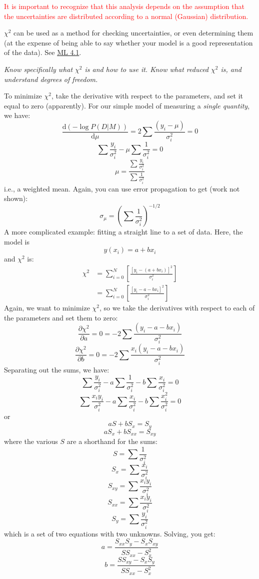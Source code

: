 \documentclass[12pt]{article}
\begin{document}
\textcolor{red}{It is important to recognize that this analysis depends
on the assumption that the uncertainties are distributed according to
a normal (Gaussian) distribution.}

$\chi^2$ can be used as a method for checking uncertainties, or even
determining them (at the expense of being able to say whether your
model is a good representation of the data).
See \href{http://astronomy.nmsu.edu/holtz/a575/images/ML4.1.png}
{ML 4.1}.

\colorbox{hl}{\parbox{0.9\textwidth}
{\emph{Know specifically what $\chi^2$ is and how to use it.
Know what reduced $\chi^2$ is, and understand degrees
of freedom.
}}}

To minimize $\chi^2$, take the derivative with respect to the parameters,
and set it equal to zero (apparently).
For our simple model of measuring a \emph{single quantity}, we have:
$$ \frac{\mathrm{d}(-\log P(D|M))}{\mathrm{d}\mu} =
2\sum\frac{(y_{i}-\mu)}{\sigma_i^2} = 0 $$
$$ \sum\frac{y_i}{\sigma_i^2} - \mu\sum\frac{1}{\sigma_i^2} = 0 $$
$$ \mu = \frac{\sum\frac{y_i}{\sigma_i^2}}{\sum\frac{1}{\sigma_i^2}}$$
i.e., a weighted mean. Again, you can use error
propagation to get (work not shown):
$$ \sigma_{\mu} = \left(\sum\frac{1}{\sigma_i^2}\right)^{-1/2}  $$
A more complicated example: fitting a straight line to a set of data.
Here, the model is
$$ y(x_i) = a + bx_i $$
and $\chi^2$ is:
\begin{align*}
    \chi^2 &= \sum_{i=0}^{N}\left[\frac{\left[y_i-(a+bx_i)\right]^2}{\sigma_i^2}\right]\\
           &= \sum_{i=0}^{N}\left[\frac{\left[y_i-a-bx_i\right]^2}{\sigma_i^2}\right]
\end{align*}
Again, we want to minimize $\chi^2$, so we take the derivatives with respect
to each of the parameters and set them to zero:
$$ \frac{\partial\chi^2}{\partial{a}} = 0 = -2\sum\frac{(y_i-a-bx_i)}{\sigma_i^2} $$
$$ \frac{\partial\chi^2}{\partial{b}} = 0 = -2\sum\frac{x_i(y_i-a-bx_i)}{\sigma_i^2} $$
Separating out the sums, we have:
$$ \sum\frac{y_i}{\sigma_i^2} -
a\sum\frac{1}{\sigma_i^2} -
b\sum\frac{x_i}{\sigma_i^2} = 0 $$
$$ \sum\frac{x_iy_i}{\sigma_i^2} -
a\sum\frac{x_i}{\sigma_i^2} -
b\sum\frac{x_i^2}{\sigma_i^2} = 0 $$
or
$$ aS + bS_{x} = S_{y} $$
$$ aS_{x} + bS_{xx} = S_{xy} $$
where the various $S$ are a shorthand for the sums:
$$ S = \sum\frac{1}{\sigma_i^2}  $$
$$ S_{x} = \sum\frac{x_i}{\sigma_i^2}  $$
$$ S_{xy} = \sum\frac{x_iy_i}{\sigma_i^2}  $$
$$ S_{xx} = \sum\frac{x_iy_i}{\sigma_i^2}  $$
$$ S_{y} = \sum\frac{y_i}{\sigma_i^2}  $$
which is a set of two equations with two unknowns. Solving, you get:
$$ a = \frac{S_{xx}S_{y} - S_{x}S_{xy}}{SS_{xx} - S_{x}^{2}}  $$
$$ b = \frac{SS_{xy} - S_{x}S_{y}}{SS_{xx} - S_{x}^{2}}  $$
\end{document}
